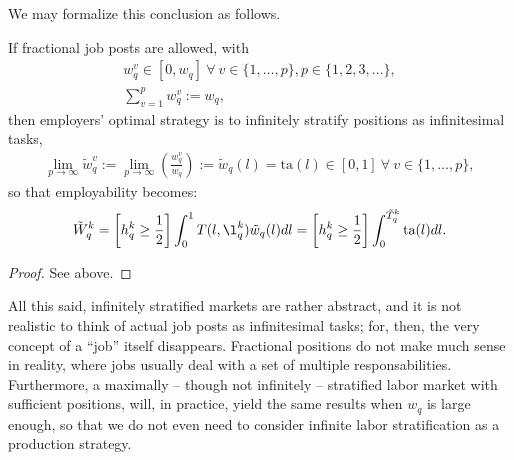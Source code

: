 \documentclass[hidelinks, nonatbib]{elsarticle}
\begin{document}
We may formalize this conclusion as follows.
\begin{lemma}
    \label{isl}
    If fractional job posts are allowed, with
    \begin{gather}
        w_{q}^{v} 
        \in 
        [0, w_q]
        \
        \forall
        \
        v \in \{1, \dots, p\}
        ,
        p \in \{1, 2, 3, \dots\}
        ,
        \\
        \sum_{v=1}^{p}
        w_{q}^{v}
        :=
        w_q
        ,
        \end{gather}
        then employers' optimal strategy is to infinitely stratify positions as infinitesimal tasks,
        \begin{gather}
            \lim_{p \rightarrow \infty}{
                \tilde{w}_{q}^{v}
            }
            := 
            \lim_{p \rightarrow \infty}{
                \left(
                    \frac{
                        w_{q}^{v}
                    }{
                        w_q
                    }
                \right)
            }
            :=
            \tilde{w}_{q}(l)
            =
            \text{ta}(l)
            \in [0,1]
            \
            \forall
            \
            v \in \{1, \dots, p\}
            ,
            \end{gather}
            so that employability becomes:
            \begin{gather}
                \tilde{W}_{q}^{k} 
                = 
                \left[
                    h_{q}^{k}
                    \geq
                    \frac{1}{2}
                \right]
                \int_{0}^{1}
                T(l, \l_{q}^{k})
                \tilde{w}_{q}(l)
                dl
                = 
                \left[
                    h_{q}^{k}
                    \geq
                    \frac{1}{2}
                \right]
                \int_{0}^{\tilde{T}_{q}^{k}}
                \text{ta}(l)
                dl
                .
                \end{gather}
    \begin{proof}
        See above.
    \end{proof}
\end{lemma}

All this said, infinitely stratified markets are rather abstract, and it is not realistic to think of actual job posts as infinitesimal tasks; for, then, the very concept of a ``job'' itself disappears. Fractional positions do not make much sense in reality, where jobs usually deal with a set of multiple responsabilities. Furthermore, a maximally -- though not infinitely -- stratified labor market with sufficient positions, will, in practice, yield the same results when $w_q$ is large enough, so that we do not even need to consider infinite labor stratification as a production strategy.
\end{document}
